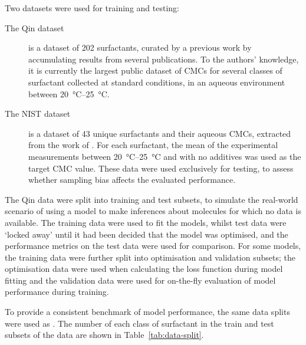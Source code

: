 Two datasets were used for training and testing:

\begin{description}
    \item[The Qin dataset] is a dataset of 202 surfactants, curated by a
          previous work \cite{qinPredictingCriticalMicelle2021} by accumulating
          results from several publications. To the authors' knowledge, it is
          currently the largest public dataset of CMCs for several classes of
          surfactant collected at standard conditions, in an aqueous environment
          between \SIrange{20}{25}{\celsius}.
    \item[The NIST dataset] is a dataset of 43 unique surfactants and their
          aqueous CMCs, extracted from the work of
          \citet{mukerjeeCriticalMicelleConcentrations1971}. For each
          surfactant, the mean of the experimental measurements between
          \SIrange{20}{25}{\degreeCelsius} and with no additives was used as the
          target CMC value. These data were used exclusively for testing, to
          assess whether sampling bias affects the evaluated performance.
\end{description}

The Qin data were split into training and test subsets, to simulate the real-world
scenario of using a model to make inferences about molecules for which no data
is available. The training data were used to fit the models, whilst test data
were `locked away' until it had been decided that the model was optimised, and
the performance metrics on the test data were used for comparison. For some
models, the training data were further split into optimisation and validation
subsets; the optimisation data were used when calculating the loss function
during model fitting and the validation data were used for on-the-fly evaluation
of model performance during training.

To provide a consistent benchmark of model performance, the same data splits
were used as \citet{qinPredictingCriticalMicelle2021}. The number of each class
of surfactant in the train and test subsets of the data are shown in
Table~\ref{tab:data-split}.

